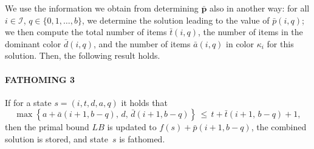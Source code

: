 \documentclass[preprint,11pt]{elsarticle}
\newcommand{\items}{\mathcal{I}}
\newcommand{\profit}{p}
\newcommand{\capacity}{b}
\theoremstyle{definition}
\begin{document}
\smallskip

We use the information we obtain from determining $\bar{\boldsymbol \profit}$ also in another way: for all $i \in \items$, $q \in \{0,1,\dots, \capacity\}$, we determine the solution leading to the value of $\bar{\profit}(i,q)$; we then compute the total number of items $\bar{t}(i,q)$, the number of items in the dominant color $\bar{d}(i,q)$, and the number of items $\bar{a}(i,q)$ in color $\kappa_i$ for this solution.
Then, the following result holds.

\paragraph{FATHOMING 3}
    If for a state $s = (i,t,d,a,q)$ it holds that
    \begin{equation*}
    \max\left\{a + \bar{a}(i+1,\capacity - q), \, d, \, \bar{d}(i+1,\capacity-q) \right\} \, \leq \, t+\bar{t}(i+1, \, \capacity- q) + 1,
    \end{equation*}
    then the primal bound $LB$ is updated to $f(s) + \bar{p}(i+1, b-q)$, the combined solution is stored, and state~$s$ is fathomed.

\medskip
\end{document}
